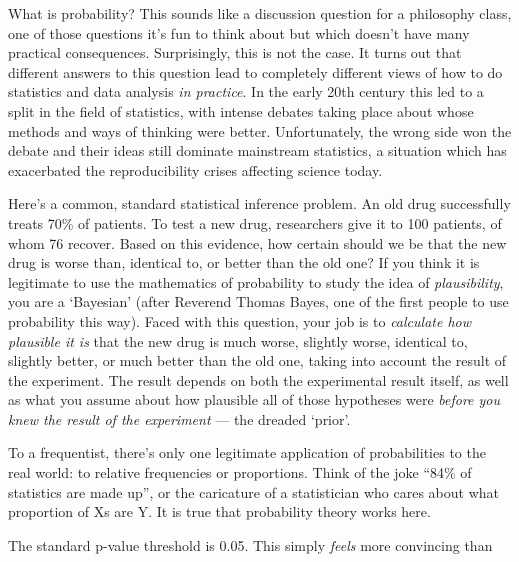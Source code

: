 \documentclass[a4paper, 12pt]{article}
\title{}
\author{Brendon J. Brewer}
\begin{document}
\sffamily
\maketitle

What is probability? This sounds like a discussion question for a
philosophy class, one of those questions it's fun to think about but which
doesn't have many practical consequences. Surprisingly, this is not the case.
It turns out that different answers to this question lead to completely
different views of how to do statistics and data analysis {\em in practice}.
In the early 20th century this led to a split in the field of statistics,
with intense debates taking place about whose methods and ways of thinking
were better. Unfortunately, the wrong side won the debate and their
ideas still dominate mainstream statistics, a situation which
has exacerbated the reproducibility crises affecting science today.

Here's a common, standard statistical inference problem. An old drug
successfully treats 70\% of patients. To test a new drug, researchers give it
to 100 patients, of whom 76 recover. Based on this evidence, how certain
should we be that the new drug is worse than, identical to, or better than the
old one? If you think it is legitimate to use the mathematics of probability
to study the idea of {\em plausibility}, you are a `Bayesian' (after Reverend
Thomas Bayes, one of the first people to use probability this way). Faced with
this question, your job is to {\em calculate how plausible it is} that the new
drug is much worse, slightly worse, identical to, slightly better, or much better
than the old one, taking into account the result of the experiment. The result
depends on both the experimental result itself, as well as what you assume
about how plausible all of those hypotheses were {\em before you knew the result
of the experiment} --- the dreaded `prior'.

To a frequentist, there's only one legitimate application of probabilities to
the real world: to relative frequencies or proportions. Think of the joke
``84\% of statistics are made up'', or the caricature of a statistician who cares
about what proportion of Xs are Y. It is true that probability theory works
here. 


The standard p-value threshold is 0.05. This simply {\em feels} more
convincing than 
\end{document}
